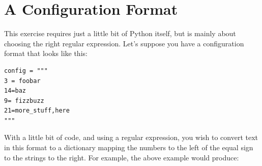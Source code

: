 \begin{Shaded}
\begin{Highlighting}[]
\OperatorTok{\textgreater{}\textgreater{}\textgreater{}}
\NormalTok{[(}\NormalTok{, }\StringTok{\textquotesingle{}\textquotesingle{}}\NormalTok{, }\NormalTok{),}
\NormalTok{(}\NormalTok{, }\NormalTok{, }\StringTok{\textquotesingle{}\textquotesingle{}}\NormalTok{),}
\NormalTok{(}\NormalTok{, }\NormalTok{, }\StringTok{\textquotesingle{}\textquotesingle{}}\NormalTok{),}
\NormalTok{(}\NormalTok{, }\StringTok{\textquotesingle{}\textquotesingle{}}\NormalTok{, }\NormalTok{),}
\NormalTok{(}\NormalTok{, }\NormalTok{, }\StringTok{\textquotesingle{}\textquotesingle{}}\NormalTok{)]}
\end{Highlighting}
\end{Shaded}

\newpage

\hypertarget{a-configuration-format}{%
\section{A Configuration Format}\label{a-configuration-format}}

This exercise requires just a little bit of Python itself, but is mainly
about choosing the right regular expression. Let's suppose you have a
configuration format that looks like this:

\begin{verbatim}
config = """
3 = foobar
14=baz
9= fizzbuzz
21=more_stuff,here
"""
\end{verbatim}

With a little bit of code, and using a regular expression, you wish to
convert text in this format to a dictionary mapping the numbers to the
left of the equal sign to the strings to the right. For example, the
above example would produce:

\begin{Shaded}
\begin{Highlighting}[]
\NormalTok{\{}\NormalTok{: }\NormalTok{, }\NormalTok{: }\NormalTok{, }\NormalTok{: }\NormalTok{, }\NormalTok{: }\NormalTok{\}}
\end{Highlighting}
\end{Shaded}

